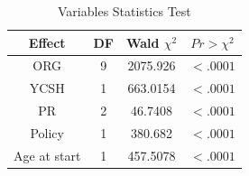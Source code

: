 \begin{table}[htbp]
	\small
	\centering
	\caption{Variables Statistics Test}
	\begin{tabular}{cccc}
		\hline
		Effect & DF    & Wald $\chi^2$ &  $Pr>\chi^2$ \\
		\hline
		ORG   & 9     & 2075.926 & $<.0001$ \\
		YCSH  & 1     & 663.0154 & $<.0001$ \\
		PR    & 2     & 46.7408 & $<.0001$ \\
		Policy & 1     & 380.682 & $<.0001$ \\
		Age at start  & 1     & 457.5078 & $<.0001$ \\
		\hline
	\end{tabular}%
	\label{tab:var2}%
\end{table}%

